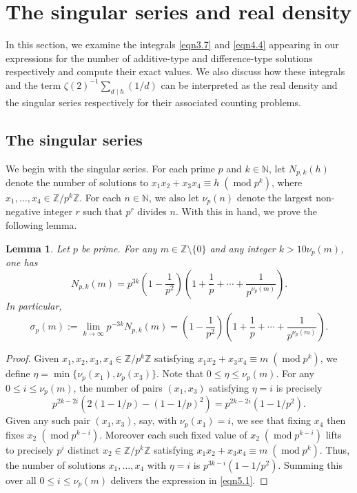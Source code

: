 \documentclass[12pt,reqno]{amsart}
\newtheorem{lemma}[theorem]{Lemma}
\theoremstyle{definition}
\theoremstyle{remark}
\numberwithin{equation}{section}
\DeclareMathOperator{\Mod}{mod}
\newcommand{\mmod}[1]{\;(\Mod{ #1})}
\renewcommand{\leq}{\leqslant}
\def \N {\mathbb{N}}
\def \Z {\mathbb{Z}}
\newcommand\1{\mathds{1}}
\begin{document}
\section{The singular series and real density}\label{sec5}

In this section, we examine the integrals \eqref{eqn3.7} and \eqref{eqn4.4} appearing in our expressions for the number of additive-type and difference-type solutions respectively and compute their exact values. We also discuss how these integrals and the term $\zeta(2)^{-1}\sum_{d\mid h}(1/d)$ can be interpreted as the real density and the singular series respectively for their associated counting problems.

\subsection{The singular series}

We begin with the singular series. For each prime $p$ and $k\in\N$, let $N_{p,k}(h)$ denote the number of solutions to $x_1x_2 + x_3 x_4 \equiv h \mmod{p^k}$, where $x_1, \ldots, x_4 \in \Z/p^k \Z$. For each $n\in\N$, we also let $\nu_p(n)$ denote the largest non-negative integer $r$ such that $p^r$ divides $n$. With this in hand, we prove the following lemma.


\begin{lemma} \label{lem5.1}
    Let $p$ be prime. For any $m\in\Z\setminus\{0\}$ and any integer $k > 10 \nu_p(m)$, one has 
\begin{equation} \label{eqn5.1}
N_{p,k}(m) = p^{3k} \left(1 - \frac{1}{p^2}\right)\left(1 + \frac{1}{p} + \cdots + \frac{1}{p^{\nu_p(m)}}\right). 
\end{equation}
In particular,
\begin{equation*}
    \sigma_p(m):= \lim_{k\to\infty}p^{-3k}N_{p,k}(m) = \left(1 - \frac{1}{p^2}\right)\left(1 + \frac{1}{p} + \cdots + \frac{1}{p^{\nu_p(m)}}\right). 
\end{equation*}
\end{lemma}
\begin{proof}
    Given $x_1, x_2,x_3, x_4 \in \Z/p^k \Z$ satisfying $x_1 x_2 + x_3 x_4 \equiv m \mmod{p^k}$, we define $\eta = \min\{ \nu_p(x_1), \nu_p(x_3)\}$. Note that $0 \leq \eta \leq \nu_p(m)$. For any $0 \leq i \leq \nu_p(m)$, the number of pairs $(x_1, x_3)$ satisfying $\eta =i$ is precisely 
\[ p^{2k-2i} ( 2( 1- 1/p) - (1- 1/p)^2 ) = p^{2k - 2i}(1 - 1/p^2 ). \] Given any such pair $(x_1, x_3)$, say, with $\nu_p(x_1) = i$, we see that fixing $x_4$ then fixes $x_2 \mmod{p^{k-i}}$. Moreover each such fixed value of $x_2 \mmod{p^{k-i}}$ lifts to precisely $p^i$ distinct $x_2 \in \Z/p^k \Z$ satisfying $x_1 x_2 + x_3 x_4 \equiv m \mmod{p^k}$. Thus, the number of solutions $x_1,\dots, x_4$ with $\eta =i$ is $p^{3k-i}(1-1/p^2)$. Summing this over all $0 \leq i \leq \nu_p(m)$ delivers the expression in \eqref{eqn5.1}.
\end{proof}
\end{document}
